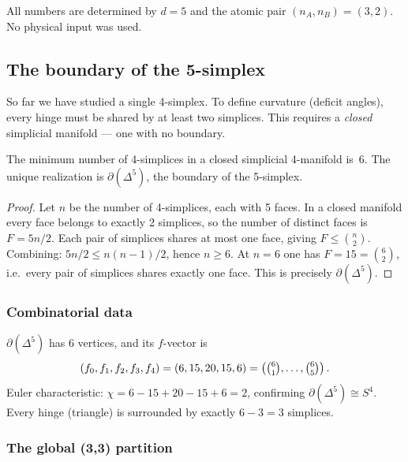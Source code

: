 All numbers are determined by $d = 5$ and the atomic pair $(n_A, n_B) = (3, 2)$. No physical input was used.

\subsection{The boundary of the 5-simplex}
\label{sec:boundary_5simplex}

So far we have studied a single 4-simplex.  To define curvature (deficit angles), every hinge must be shared by at least two simplices.  This requires a \emph{closed} simplicial manifold --- one with no boundary.

\begin{theorem}
\label{thm:minimal_closed}
The minimum number of 4-simplices in a closed simplicial 4-manifold is~6.  The unique realization is $\partial(\Delta^5)$, the boundary of the 5-simplex.
\end{theorem}

\begin{proof}
Let $n$ be the number of 4-simplices, each with 5 faces.  In a closed manifold every face belongs to exactly 2 simplices, so the number of distinct faces is $F = 5n/2$.  Each pair of simplices shares at most one face, giving $F \leq \binom{n}{2}$.  Combining: $5n/2 \leq n(n{-}1)/2$, hence $n \geq 6$.  At $n = 6$ one has $F = 15 = \binom{6}{2}$, i.e.\ every pair of simplices shares exactly one face.  This is precisely $\partial(\Delta^5)$.
\end{proof}

\subsubsection{Combinatorial data}

$\partial(\Delta^5)$ has 6 vertices, and its $f$-vector is
\begin{equation}
(f_0, f_1, f_2, f_3, f_4) = (6, 15, 20, 15, 6) = \left(\tbinom{6}{1},\ldots,\tbinom{6}{5}\right).
\end{equation}
Euler characteristic: $\chi = 6 - 15 + 20 - 15 + 6 = 2$, confirming $\partial(\Delta^5) \cong S^4$.  Every hinge (triangle) is surrounded by exactly $6 - 3 = 3$ simplices.

\subsubsection{The global (3,3) partition}

